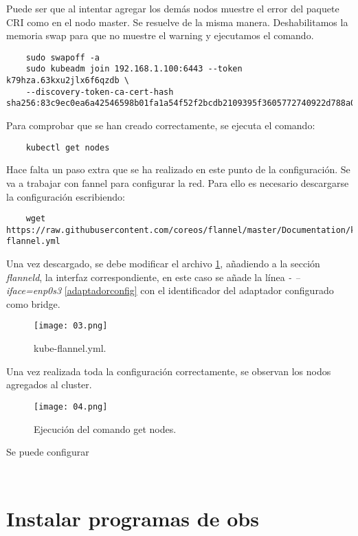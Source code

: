 \documentclass[../main.tex]{subfiles}
\begin{document}
Puede ser que al intentar agregar los demás nodos muestre el error del paquete CRI como en el nodo master. Se resuelve de la misma manera. Deshabilitamos la memoria swap para que no muestre el warning y ejecutamos el comando.
\begin{lstlisting}
	sudo swapoff -a	 
	sudo kubeadm join 192.168.1.100:6443 --token k79hza.63kxu2jlx6f6qzdb \
	--discovery-token-ca-cert-hash sha256:83c9ec0ea6a42546598b01fa1a54f52f2bcdb2109395f3605772740922d788a0
\end{lstlisting}
Para comprobar que se han creado correctamente, se ejecuta el comando:
\begin{lstlisting}
	kubectl get nodes
\end{lstlisting}
Hace falta un paso extra que se ha realizado en este punto de la configuración. Se va a trabajar con fannel para configurar la red. Para ello es necesario descargarse la configuración escribiendo:
\begin{lstlisting}
	wget https://raw.githubusercontent.com/coreos/flannel/master/Documentation/kube-flannel.yml	
\end{lstlisting}
Una vez descargado, se debe modificar el archivo \ref{flannel}, añadiendo a la sección \textit{flanneld}, la interfaz correspondiente, en este caso se añade la línea \textit{- --iface=enp0s3} \ref{adaptadorconfig} con el identificador del adaptador configurado como bridge.

\begin{figure}[!h]
	\texttt{[image: 03.png]}
	\caption{kube-flannel.yml.}
	\label{flannel}
\end{figure} 
Una vez realizada toda la configuración correctamente, se observan los nodos agregados al cluster.

\begin{figure}[!h]
	\texttt{[image: 04.png]}
	\caption{Ejecución del comando get nodes.}
	\label{getNodes}
\end{figure} 
Se puede configurar 

\begin{lstlisting}
\end{lstlisting}

\begin{lstlisting}
\end{lstlisting}


\section{Instalar programas de obs}
\end{document}
